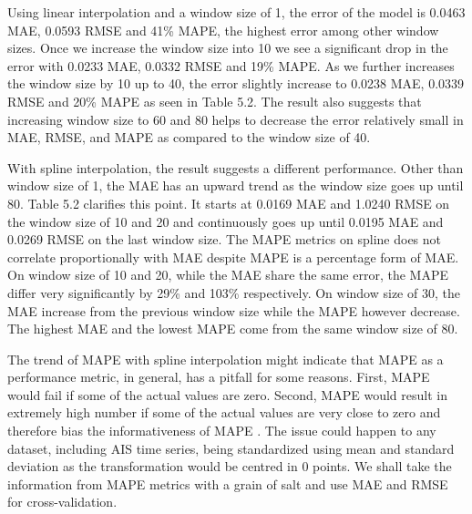 Using linear interpolation and a window size of 1, the error of the model is 0.0463 MAE, 0.0593 RMSE and 41\% MAPE, the highest error among other window sizes. Once we increase the window size into 10 we see a significant drop in the error with 0.0233 MAE, 0.0332 RMSE and 19\% MAPE. As we further increases the window size by 10 up to 40, the error slightly increase to 0.0238 MAE, 0.0339 RMSE and 20\% MAPE as seen in Table 5.2. The result also suggests that increasing window size to 60 and 80 helps to decrease the error relatively small in MAE, RMSE, and MAPE as compared to the window size of 40.

With spline interpolation, the result suggests a different performance. Other than window size of 1, the MAE has an upward trend as the window size goes up until 80. Table 5.2 clarifies this point. It starts at 0.0169 MAE and 1.0240 RMSE on the window size of 10 and 20 and continuously goes up until 0.0195 MAE and 0.0269 RMSE on the last window size. The MAPE metrics on spline does not correlate proportionally with MAE despite MAPE is a percentage form of MAE. On window size of 10 and 20, while the MAE share the same error, the MAPE differ very significantly by 29\% and 103\% respectively. On window size of 30, the MAE increase from the previous window size while the MAPE however decrease. The highest MAE and the lowest MAPE come from the same window size of 80. 

The trend of MAPE with spline interpolation might indicate that MAPE as a performance metric, in general, has a pitfall for some reasons. First, MAPE would fail if some of the actual values are zero. Second, MAPE would result in extremely high number if some of the actual values are very close to zero and therefore bias the informativeness of MAPE \cite{hyndman2006another}. The issue could happen to any dataset, including AIS time series, being standardized using mean and standard deviation as the transformation would be centred in 0 points. We shall take the information from MAPE metrics with a grain of salt and use MAE and RMSE for cross-validation.


